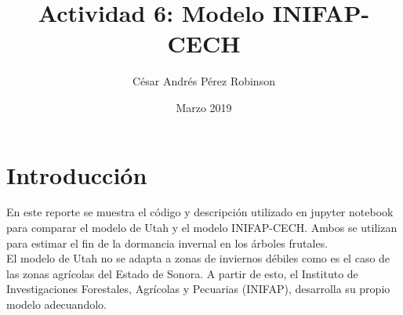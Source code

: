 \documentclass[11pt, spanish]{report}
\title{Actividad 6: Modelo INIFAP-CECH}
\author{César Andrés Pérez Robinson }
\date{Marzo 2019}
\begin{document}
\maketitle

\section{Introducción}
En este reporte se muestra el código y descripción utilizado en jupyter notebook para comparar el modelo de Utah y el modelo INIFAP-CECH. Ambos se utilizan para estimar el fin de la dormancia invernal en los árboles frutales.\\
El modelo de Utah no se adapta a zonas de inviernos débiles como es el caso de las zonas agrícolas del Estado de Sonora. A partir de esto, el Instituto de Investigaciones Forestales, Agrícolas y Pecuarias (INIFAP), desarrolla su propio modelo adecuandolo.
\end{document}

